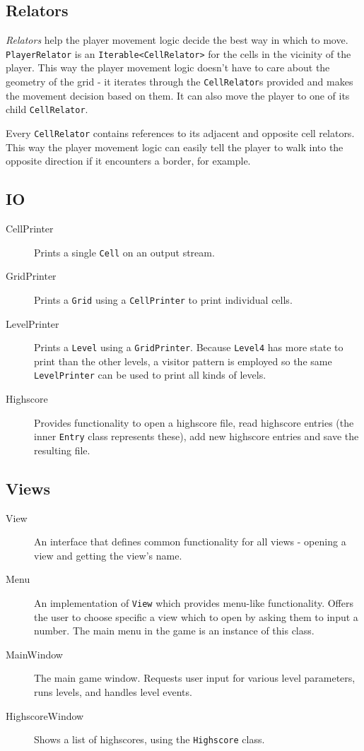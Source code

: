 \documentclass[a4paper]{article}
\begin{document}
	\subsection{Relators}
	\label{sec:relators}
	
	\emph{Relators} help the player movement logic decide the best way in which to move.
	\verb|PlayerRelator| is an \verb|Iterable<CellRelator>| for the cells in the vicinity of the player. This way the player movement logic doesn't have to care about the geometry of the grid - it iterates through the \verb|CellRelator|s provided and makes the movement decision based on them. It can also move the player to one of its child \verb|CellRelator|.
	
	Every \verb|CellRelator| contains references to its adjacent and opposite cell relators. This way the player movement logic can easily tell the player to walk into the opposite direction if it encounters a border, for example.
	
	\subsection{IO}
	
	\begin{description}
	\item[CellPrinter] Prints a single \verb|Cell| on an output stream.
	\item[GridPrinter] Prints a \verb|Grid| using a \verb|CellPrinter| to print individual cells.
	\item[LevelPrinter] Prints a \verb|Level| using a \verb|GridPrinter|. Because \verb|Level4| has more state to print than the other levels, a visitor pattern is employed so the same \verb|LevelPrinter| can be used to print all kinds of levels.
	\item[Highscore] Provides functionality to open a highscore file, read highscore entries (the inner \verb|Entry| class represents these), add new highscore entries and save the resulting file.
	\end{description}
	
	\subsection{Views}
	
	\begin{description}
	\item[View] An interface that defines common functionality for all views - opening a view and getting the view's name.
	\item[Menu] An implementation of \verb|View| which provides menu-like functionality. Offers the user to choose specific a view which to open by asking them to input a number. The main menu in the game is an instance of this class.
	\item[MainWindow] The main game window. Requests user input for various level parameters, runs levels, and handles level events.
	\item[HighscoreWindow] Shows a list of highscores, using the \verb|Highscore| class.
	\end{description}
	
\end{document}
